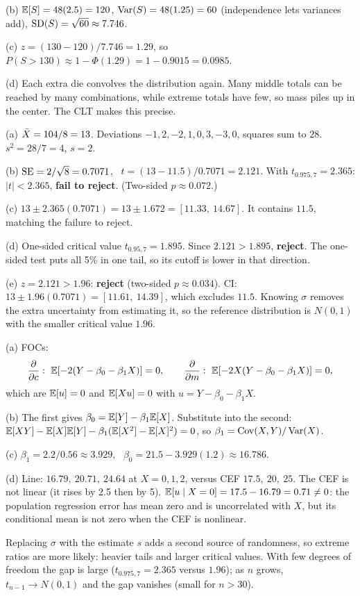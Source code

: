 \documentclass[11pt]{article}
\begin{document}
(b) $\mathbb{E}[S]=48(2.5)=120$, $\operatorname{Var}(S)=48(1.25)=60$ (independence lets variances add), $\operatorname{SD}(S)=\sqrt{60}\approx7.746$.

(c) $z=(130-120)/7.746=1.29$, so $P(S>130)\approx1-\Phi(1.29)=1-0.9015=0.0985$.

(d) Each extra die convolves the distribution again. Many middle totals can be reached by many combinations, while extreme totals have few, so mass piles up in the center. The CLT makes this precise.

(a) $\bar{X}=104/8=13$. Deviations $-1,2,-2,1,0,3,-3,0$, squares sum to $28$. $s^2=28/7=4$, $s=2$.

(b) $\operatorname{SE}=2/\sqrt8=0.7071$, \ $t=(13-11.5)/0.7071=2.121$. With $t_{0.975,7}=2.365$: $|t|<2.365$, \textbf{fail to reject}. (Two-sided $p\approx0.072$.)

(c) $13\pm2.365(0.7071)=13\pm1.672=[11.33,\ 14.67]$. It contains $11.5$, matching the failure to reject.

(d) One-sided critical value $t_{0.95,7}=1.895$. Since $2.121>1.895$, \textbf{reject}. The one-sided test puts all 5\% in one tail, so its cutoff is lower in that direction.

(e) $z=2.121>1.96$: \textbf{reject} (two-sided $p\approx0.034$). CI: $13\pm1.96(0.7071)=[11.61,\ 14.39]$, which excludes $11.5$. Knowing $\sigma$ removes the extra uncertainty from estimating it, so the reference distribution is $N(0,1)$ with the smaller critical value $1.96$.

(a) FOCs:
\[ \frac{\partial}{\partial c}:\ \E[-2(Y-\beta_0-\beta_1X)]=0, \qquad \frac{\partial}{\partial m}:\ \E[-2X(Y-\beta_0-\beta_1X)]=0, \]
which are $\mathbb{E}[u]=0$ and $\mathbb{E}[Xu]=0$ with $u=Y-\beta_0-\beta_1X$.

(b) The first gives $\beta_0=\mathbb{E}[Y]-\beta_1\mathbb{E}[X]$. Substitute into the second: $\mathbb{E}[XY]-\mathbb{E}[X]\mathbb{E}[Y]-\beta_1(\mathbb{E}[X^2]-\mathbb{E}[X]^2)=0$, so $\beta_1=\operatorname{Cov}(X,Y)/\operatorname{Var}(X)$.

(c) $\beta_1=2.2/0.56\approx3.929$, \ $\beta_0=21.5-3.929(1.2)\approx16.786$.

(d) Line: $16.79,\ 20.71,\ 24.64$ at $X=0,1,2$, versus CEF $17.5,\ 20,\ 25$. The CEF is not linear (it rises by 2.5 then by 5). $\mathbb{E}[u\mid X=0]=17.5-16.79=0.71\ne0$: the population regression error has mean zero and is uncorrelated with $X$, but its conditional mean is not zero when the CEF is nonlinear.


 Replacing $\sigma$ with the estimate $s$ adds a second source of randomness, so extreme ratios are more likely: heavier tails and larger critical values. With few degrees of freedom the gap is large ($t_{0.975,7}=2.365$ versus $1.96$); as $n$ grows, $t_{n-1}\to N(0,1)$ and the gap vanishes (small for $n>30$).
\end{document}

